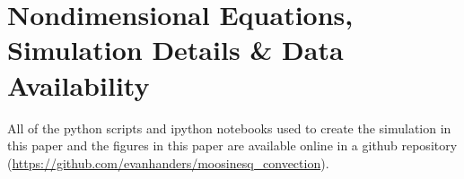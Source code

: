 \section{Nondimensional Equations, Simulation Details \& Data Availability}
\label{app:nondim_equations}

All of the python scripts and ipython notebooks used to create the simulation in this paper and the figures in this paper are available online in a github repository (\url{https://github.com/evanhanders/moosinesq_convection}).
